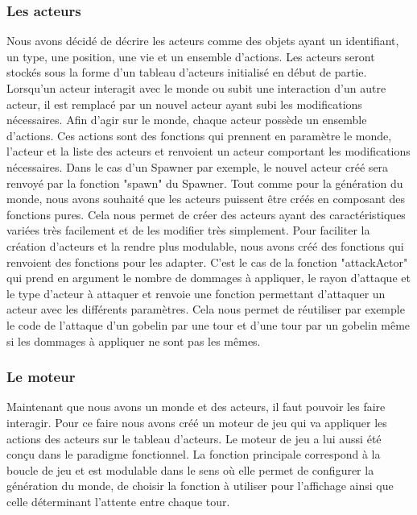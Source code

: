 \documentclass[french]{article}
\begin{document}
\subsubsection{Les acteurs}

Nous avons décidé de décrire les acteurs comme des objets ayant un identifiant, un type, une position, une vie et un ensemble d'actions.
Les acteurs seront stockés sous la forme d'un tableau d'acteurs initialisé en début de partie. Lorsqu'un acteur interagit avec le monde ou subit une interaction d'un autre acteur, il est remplacé par un nouvel acteur ayant subi les modifications nécessaires.
Afin d'agir sur le monde, chaque acteur possède un ensemble d'actions. Ces actions sont des fonctions qui prennent en paramètre le monde, l'acteur et la liste des acteurs et renvoient un acteur comportant les modifications nécessaires.
Dans le cas d'un Spawner par exemple, le nouvel acteur créé sera renvoyé par la fonction "spawn" du Spawner.
Tout comme pour la génération du monde, nous avons souhaité que les acteurs puissent être créés en composant des fonctions pures.
Cela nous permet de créer des acteurs ayant des caractéristiques variées très facilement et de les modifier très simplement.
Pour faciliter la création d'acteurs et la rendre plus modulable, nous avons créé des fonctions qui renvoient des fonctions pour les adapter.
C'est le cas de la fonction "attackActor" qui prend en argument le nombre de dommages à appliquer, le rayon d'attaque et le type d'acteur à attaquer et renvoie une fonction permettant d'attaquer un acteur avec les différents paramètres. Cela nous permet de réutiliser par exemple le code de l'attaque d'un gobelin par une tour et d'une tour par un gobelin même si les dommages à appliquer ne sont pas les mêmes.


\subsubsection{Le moteur}

Maintenant que nous avons un monde et des acteurs, il faut pouvoir les faire interagir.
Pour ce faire nous avons créé un moteur de jeu qui va appliquer les actions des acteurs sur le tableau d'acteurs.
Le moteur de jeu a lui aussi été conçu dans le paradigme fonctionnel.
La fonction principale correspond à la boucle de jeu et est modulable dans le sens où elle permet de configurer la génération du monde, de choisir la fonction à utiliser pour l'affichage ainsi que celle déterminant l'attente entre chaque tour.
\end{document}
